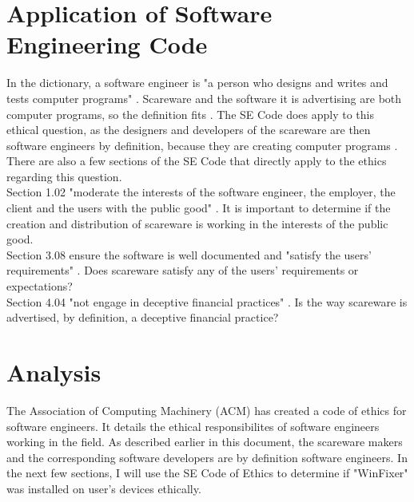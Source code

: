 \documentclass[11pt]{article}
\begin{document}
\begin{multicols}{2}
\section{Application of Software Engineering Code}
In the dictionary, a software engineer is "a person who designs and writes and tests computer programs" \cite{dictionary}.  Scareware and the software it is advertising are both computer programs, so the definition fits \cite{bbcmillionstricked}. The SE Code does apply to this ethical question, as the designers and developers of the scareware are then software engineers by definition, because they are creating computer programs \cite{secode}\cite{bbcmillionstricked}. There are also a few sections of the SE Code that directly apply to the ethics regarding this question. 
\vspace{10pt} \\
Section 1.02 "moderate the interests of the software engineer, the employer, the client and the users with the public good" \cite{secode}. It is important to determine if the creation and distribution of scareware is working in the interests of the public good. 
\vspace{10pt} \\
Section 3.08 ensure the software is well documented and "satisfy the users' requirements" \cite{secode}. Does scareware satisfy any of the users' requirements or expectations?
\vspace{10pt} \\
Section 4.04 "not engage in deceptive financial practices" \cite{secode}. Is the way scareware is advertised, by definition, a deceptive financial practice?

\section{Analysis}
The Association of Computing Machinery (ACM) has created a code of ethics for software engineers. It details the ethical responsibilites of software engineers working in the field. As described earlier in this document, the scareware makers and the corresponding software developers are by definition software engineers. In the next few sections, I will use the SE Code of Ethics to determine if "WinFixer" was installed on user's devices ethically.

\end{multicols}
\end{document}
